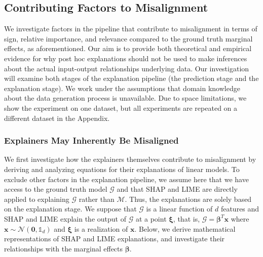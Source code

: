 \documentclass[12pt]{article}  %
\begin{document}
    \subsection{Contributing Factors to  Misalignment}
        \label{sec:causes_of_misalignment}
        We investigate factors in the pipeline that contribute to misalignment in terms of sign, relative importance, and relevance compared to the ground truth marginal effects, as aforementioned. Our aim is to provide both theoretical and empirical evidence for why post hoc explanations should not be used to make inferences about the actual input-output relationships underlying data. Our investigation will examine both stages of the explanation pipeline (the prediction stage and the explanation stage). %
        We work under the assumptions that domain knowledge about the data generation process is unavailable. Due to space limitations, we show the experiment on one dataset, but all experiments are repeated on a different dataset in the Appendix. %


    \subsubsection{Explainers May Inherently Be Misaligned}
    \label{sec:theoretical_considerations}
   We first investigate how the explainers themselves contribute to misalignment by deriving and analyzing equations for their explanations of linear models. To exclude other factors in the explanation pipeline, we assume here that we have access to the ground truth model $\mathcal{G}$ and that SHAP and LIME are directly applied to explaining $\mathcal{G}$ rather than $\mathcal{M}$. Thus, the explanations are solely based on the explanation stage. We suppose that $\mathcal{G}$ is a linear function of $d$ features and SHAP and LIME explain the output of $\mathcal{G}$ at a point $\boldsymbol{\xi}$, that is, $\mathcal{G} = \boldsymbol{\beta}^T \mathbf{x}$ where $\mathbf{x} \sim \mathcal{N}(\mathbf{0},\mathds{1}_d)$ and $\boldsymbol{\xi}$ is a realization of $\mathbf{x}$. Below, we derive mathematical representations of SHAP and LIME explanations, and investigate their relationships with the marginal effects $\boldsymbol{\beta}$.
\end{document}
